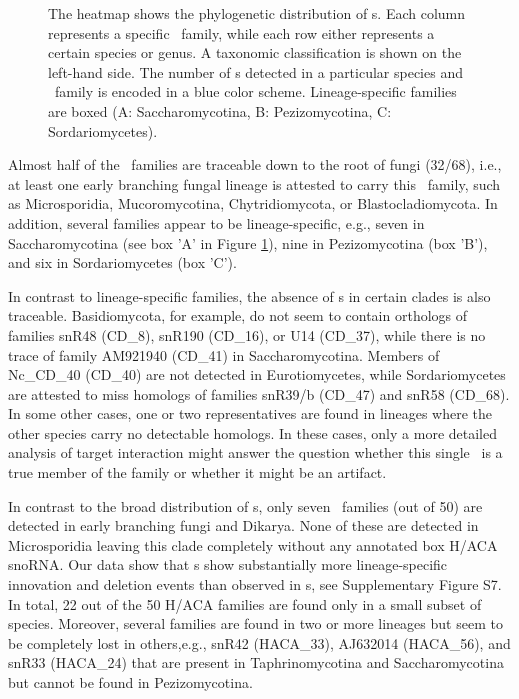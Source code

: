 \begin{figure}
  \caption{The heatmap shows the phylogenetic distribution of \cd s. Each column represents a specific \sno\ family,
    while each row either represents a certain species or genus. A
    taxonomic classification is shown on the left-hand side. The
    number of \sno s detected in a particular species and \sno\ family
    is encoded in a blue color scheme. Lineage-specific families are
    boxed (A: Saccharomycotina, B: Pezizomycotina, C:
    Sordariomycetes). %
  }
  \label{fig:heatmap_CD_snoRNAs} 
\end{figure}

Almost half of the \cd\ families are traceable down to the root of
fungi (32/68), i.e., at least one early branching fungal lineage is
attested to carry this \sno\ family, such as Microsporidia,
Mucoromycotina, Chytridiomycota, or Blastocladiomycota. In addition,
several families appear to be lineage-specific, e.g., seven in
Saccharomycotina (see box 'A' in Figure \ref{fig:heatmap_CD_snoRNAs}),
nine in Pezizomycotina (box 'B'), and six in Sordariomycetes (box
'C').

In contrast to lineage-specific families, the absence of \sno s in
certain clades is also traceable. Basidiomycota, for example, do not
seem to contain orthologs of families snR48 (CD\_8), snR190 (CD\_16),
or U14 (CD\_37), while there is no trace of family AM921940 (CD\_41)
in Saccharomycotina. Members of Nc\_CD\_40 (CD\_40) are not detected
in Eurotiomycetes, while Sordariomycetes are attested to miss homologs
of families snR39/b (CD\_47) and snR58 (CD\_68). In some other cases,
one or two representatives are found in lineages where the other
species carry no detectable homologs. In these cases, only a more
detailed analysis of target interaction might answer the question
whether this single \sno\ is a true member of the family or whether it
might be an artifact.

In contrast to the broad distribution of \cd s, only seven \haca\
families (out of 50) are detected in early branching fungi and
Dikarya. None of these are detected in Microsporidia leaving this
clade completely without any annotated box H/ACA snoRNA. Our data show
that \haca s show substantially more lineage-specific innovation and
deletion events than observed in \cd s, see Supplementary Figure
S7. In total, 22 out of the 50 H/ACA families are found only in a
small subset of species. Moreover, several families are found in two
or more lineages but seem to be completely lost in others,e.g.,
snR42 (HACA\_33), AJ632014 (HACA\_56), and snR33 (HACA\_24) that are
present in Taphrinomycotina and Saccharomycotina but cannot be found
in Pezizomycotina.

